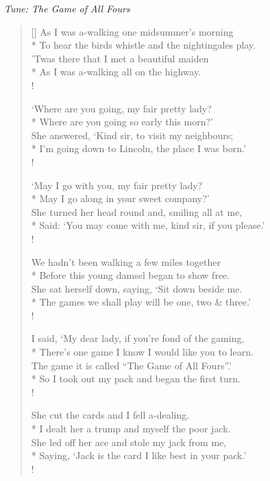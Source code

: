 \documentclass[MAIN]{subfiles}
\begin{document}
\bigskip

\begin{center}
{\it Tune: The Game of All Fours}
\end{center}

\bigskip

\settowidth{\versewidth}{\vin To hear the birds whistle and the nightingales play.}
\begin{verse}[\versewidth]
As I was a-walking one midsummer's morning\\*
\vin To hear the birds whistle and the nightingales play.\\
'Twas there that I met a beautiful maiden\\*
\vin As I was a-walking all on the highway.\\!

`Where are you going, my fair pretty lady?\\*
\vin Where are you going so early this morn?'\\
She answered, `Kind sir, to visit my neighbours;\\*
\vin I'm going down to {\sc Lincoln}, the place I was born.'\\!

`May I go with you, my fair pretty lady?\\*
\vin May I go along in your sweet company?'\\
She turned her head round and, smiling all at me,\\*
\vin Said: `You may come with me, kind sir, if you please.'\\!

We hadn't been walking a few miles together\\*
\vin Before this young damsel began to show free.\\
She sat herself down, saying, `Sit down beside me.\\*
\vin The games we shall play will be one, two \& three.'\\!

I said, `My dear lady, if you're fond of the gaming,\\*
\vin There's one game I know I would like you to learn.\\
The game it is called ``The Game of All Fours''.'\\*
\vin So I took out my pack and began the first turn.\\!

She cut the cards and I fell a-dealing.\\*
\vin I dealt her a trump and myself the poor jack.\\
She led off her ace and stole my jack from me,\\*
\vin Saying, `Jack is the card I like best in your pack.'\\!


\end{verse}
\end{document}
